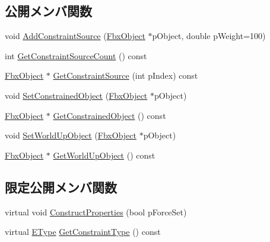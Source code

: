 \subsection*{公開メンバ関数}
\begin{DoxyCompactItemize}
\item 
void \hyperlink{class_fbx_constraint_aim_aca502b2b0a4587133e843c5b917acee6}{Add\+Constraint\+Source} (\hyperlink{class_fbx_object}{Fbx\+Object} $\ast$p\+Object, double p\+Weight=100)
\item 
int \hyperlink{class_fbx_constraint_aim_aa58f34b660f30caff3f89c5372a25a5c}{Get\+Constraint\+Source\+Count} () const
\item 
\hyperlink{class_fbx_object}{Fbx\+Object} $\ast$ \hyperlink{class_fbx_constraint_aim_ae5d3634ababc5cb0af0734b41c78218a}{Get\+Constraint\+Source} (int p\+Index) const
\item 
void \hyperlink{class_fbx_constraint_aim_a52db6306c4245941b42b716522b105d8}{Set\+Constrained\+Object} (\hyperlink{class_fbx_object}{Fbx\+Object} $\ast$p\+Object)
\item 
\hyperlink{class_fbx_object}{Fbx\+Object} $\ast$ \hyperlink{class_fbx_constraint_aim_a7245132b757540df762f9b37dae533cf}{Get\+Constrained\+Object} () const
\item 
void \hyperlink{class_fbx_constraint_aim_a866c7a2937ac681ec5024654ccc0c053}{Set\+World\+Up\+Object} (\hyperlink{class_fbx_object}{Fbx\+Object} $\ast$p\+Object)
\item 
\hyperlink{class_fbx_object}{Fbx\+Object} $\ast$ \hyperlink{class_fbx_constraint_aim_a3d795ffc5b595f49868c6e03a8a9245f}{Get\+World\+Up\+Object} () const
\end{DoxyCompactItemize}
\subsection*{限定公開メンバ関数}
\begin{DoxyCompactItemize}
\item 
virtual void \hyperlink{class_fbx_constraint_aim_a295c1f47dce7a051886dc6b9bb68025f}{Construct\+Properties} (bool p\+Force\+Set)
\item 
virtual \hyperlink{class_fbx_constraint_a49c1634663395eab7c28856df233ec66}{E\+Type} \hyperlink{class_fbx_constraint_aim_a061ee3079d1182fa2e1a5eeebff01b15}{Get\+Constraint\+Type} () const
\end{DoxyCompactItemize}
